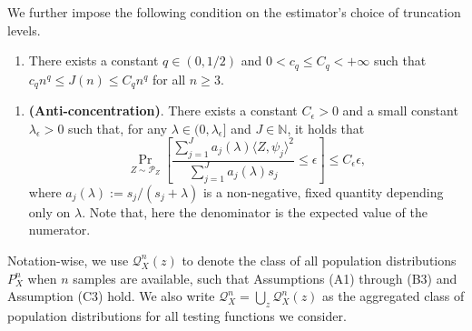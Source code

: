 \documentclass[11pt,a4paper]{article}
\theoremstyle{definition}
\theoremstyle{plain}
\theoremstyle{remark}
\begin{document}
We further impose the following condition on the estimator's choice of truncation levels.
\begin{enumerate}
\item[(C2)] There exists a constant $q\in(0,1/2)$ and $0<c_q\leq C_q<+\infty$ such that $c_q n^q\leq J(n)\leq C_q n^q$ for all $n\geq 3$.
\end{enumerate}

{\color{orange}
\begin{enumerate}
\item[(C3)] \textbf{(Anti-concentration)}. There exists a constant $C_\epsilon>0$ and a small constant $\lambda_\epsilon>0$ such that, for any $\lambda\in(0,\lambda_\epsilon]$ and $J\in\mathbb N$,
it holds that
$$
\Pr_{Z\sim \mathcal P_Z}\left[\frac{\sum_{j=1}^{J} a_j(\lambda)\langle Z,\psi_j\rangle^2}{\sum_{j=1}^{J} a_j(\lambda)s_j} \leq \epsilon\right] \leq C_\epsilon \epsilon,
$$
where $a_j(\lambda) := s_j/(s_j+\lambda)$ is a non-negative, fixed quantity depending only on $\lambda$.
Note that, here the denominator is the expected value of the numerator.
\end{enumerate}
Notation-wise, we use $\mathcal Q_X^n(z)$ to denote the class of all population distributions $P_X^n$ when $n$ samples are available, such that Assumptions (A1) through (B3) and Assumption (C3) hold.
We also write $\mathcal Q_X^n = \bigcup_{z}\mathcal Q_X^n(z)$ as the aggregated class of population distributions for all testing functions we consider.
}
\end{document}
